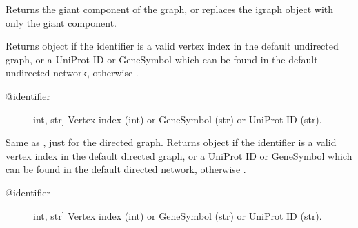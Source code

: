 \documentclass[letterpaper,10pt,english]{sphinxmanual}
\begin{document}
\begin{fulllineitems}

\begin{fulllineitems}
\label{\detokenize{main:pypath.main.PyPath.get_giant}}
Returns the giant component of the graph, or
replaces the igraph object with only the giant
component.

\end{fulllineitems}


\begin{fulllineitems}
\label{\detokenize{main:pypath.main.PyPath.get_node}}
Returns  object if the identifier
is a valid vertex index in the default undirected graph,
or a UniProt ID or GeneSymbol which can be found in the
default undirected network, otherwise .
\begin{description}
\item[{@identifier}] \leavevmode{[}int, str{]}
Vertex index (int) or GeneSymbol (str) or UniProt ID (str).

\end{description}

\end{fulllineitems}


\begin{fulllineitems}
\label{\detokenize{main:pypath.main.PyPath.get_node_d}}
Same as , just for the directed graph.
Returns  object if the identifier
is a valid vertex index in the default directed graph,
or a UniProt ID or GeneSymbol which can be found in the
default directed network, otherwise .
\begin{description}
\item[{@identifier}] \leavevmode{[}int, str{]}
Vertex index (int) or GeneSymbol (str) or UniProt ID (str).

\end{description}

\end{fulllineitems}


\end{fulllineitems}
\end{document}
